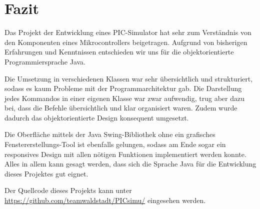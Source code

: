 \chapter{Fazit}

Das Projekt der Entwicklung eines PIC-Simulator hat sehr zum Verständnis von den Komponenten eines Mikrocontrollers beigetragen. Aufgrund von bisherigen Erfahrungen und Kenntnissen entschieden wir uns für die objektorientierte Programmiersprache Java.

Die Umsetzung in verschiedenen Klassen war sehr übersichtlich und strukturiert, sodass es kaum Probleme mit der Programmarchitektur gab. Die Darstellung jedes Kommandos in einer eigenen Klasse war zwar aufwendig, trug aber dazu bei, dass die Befehle übersichtlich und klar organisiert waren. Zudem wurde dadurch das objektorientierte Design konsequent umgesetzt.

Die Oberfläche mittels der Java Swing-Bibliothek ohne ein grafisches Fenstererstellungs-Tool ist ebenfalls gelungen, sodass am Ende sogar ein responsives Design mit allen nötigen Funktionen implementiert werden konnte. Alles in allem kann gesagt werden, dass sich die Sprache Java für die Entwicklung dieses Projektes gut eignet.

Der Quellcode dieses Projekts kann unter \href{https://github.com/teamwaldstadt/PICsimu/}{https://github.com/teamwaldstadt/PICsimu/} eingesehen werden.
